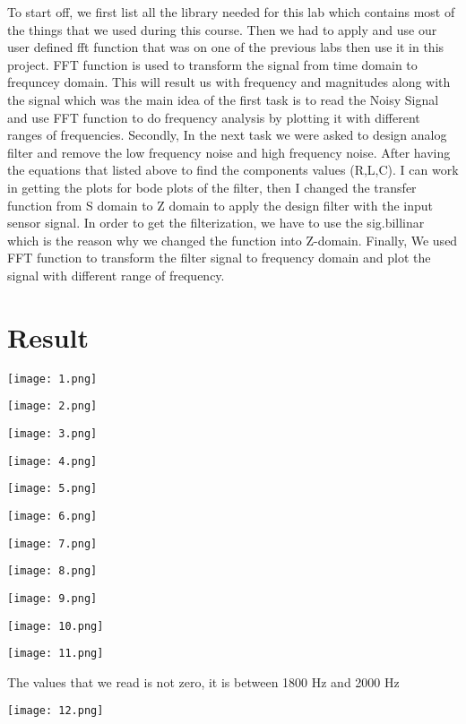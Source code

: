 \documentclass[12pt]{report}
\begin{document}
To start off, we first list all the library needed for this lab which contains most of the things that we used during this course. Then we had to apply and use our user defined fft function that was on one of the previous labs then use it in this project. FFT function is used to transform the signal from time domain to frequncey domain. This will result us with frequency and magnitudes along with the signal which was the main idea of the first task is to read the Noisy Signal and use FFT function to do frequency analysis by plotting it with different ranges of frequencies. Secondly, In the next task we were asked to design analog filter and remove the low frequency noise and high frequency noise. After having the equations that listed above to find the components values (R,L,C). I can work in getting the plots for bode plots of the filter, then I changed the transfer function from S domain to Z domain to apply the design filter with the input sensor signal. In order to get the filterization, we have to use the sig.billinar which is the reason why we changed the function into Z-domain. Finally, We used FFT function to transform the filter signal to frequency domain and plot the signal with different range of frequency. 





\section{Result}

\texttt{[image: 1.png]} 


\texttt{[image: 2.png]} 


\texttt{[image: 3.png]} 


\texttt{[image: 4.png]} 

\texttt{[image: 5.png]} 


\texttt{[image: 6.png]} 


\texttt{[image: 7.png]} 


\texttt{[image: 8.png]} 

\texttt{[image: 9.png]}


\texttt{[image: 10.png]} 


\texttt{[image: 11.png]} 

The values that we read is not zero, it is between 1800 Hz and 2000 Hz

\texttt{[image: 12.png]} 
\end{document}
